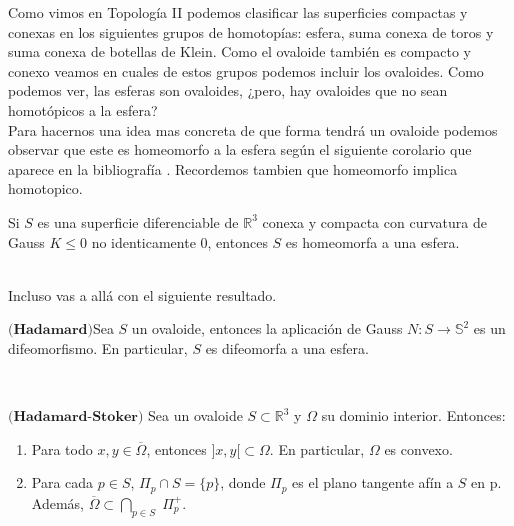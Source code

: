 Como vimos en Topología II podemos clasificar las superficies compactas y conexas en los siguientes grupos de homotopías: esfera, suma conexa de toros y suma conexa de botellas de Klein. Como el ovaloide también es compacto y conexo veamos en cuales de estos grupos podemos incluir los ovaloides. Como podemos ver, las esferas son ovaloides, ¿pero, hay ovaloides que no sean homotópicos a la esfera?
${ }$\\

Para hacernos una idea mas concreta de que forma tendrá un ovaloide podemos observar que este es homeomorfo a la esfera según el siguiente corolario que aparece en la bibliografía \cite{ref1}. Recordemos tambien que homeomorfo implica homotopico.
${ }$\\

\begin{corolario}
	Si $S$ es una superficie diferenciable de $\mathbb{R}^3$ conexa y compacta con curvatura de Gauss $K \leq 0$ no identicamente $0$, entonces $S$ es homeomorfa a una esfera.
\end{corolario}
${ }$\\

Incluso vas a allá con el siguiente resultado.
${ }$\\

\begin{teorema}
	$\textbf{(Hadamard)}$Sea $S$ un ovaloide, entonces la aplicación de Gauss $N : S \to \mathbb{S}^2$ es un difeomorfismo. En particular, $S$ es difeomorfa a una esfera.
\end{teorema}
${ }$\\



\begin{teorema} \label{teo:hadamard}
	$\textbf{(Hadamard-Stoker)}$ Sea un ovaloide $S \subset \mathbb{R}^3$ y $\Omega$ su dominio interior. Entonces:
	
	\begin{enumerate}
		\item Para todo $x, y \in \overline{\Omega}$, entonces $]x, y[ \subset \Omega$. En particular, $\Omega$ es convexo.
		\item Para cada $p \in S$, $\Pi_p \cap S = \{p\}$, donde $\Pi_p$ es el plano tangente afín a $S$ en p. Además, $\overline{\Omega} \subset \bigcap_{p \in S} \; \Pi^{+}_{p}$.
	\end{enumerate}
\end{teorema}
${ }$\\



